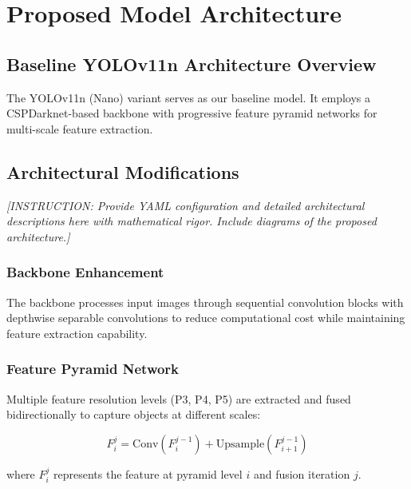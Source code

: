 \documentclass[11pt,a4paper]{article}
\begin{document}

\section{Proposed Model Architecture}
\label{sec:proposed_arch}

\subsection{Baseline YOLOv11n Architecture Overview}

The YOLOv11n (Nano) variant serves as our baseline model. It employs a CSPDarknet-based backbone 
with progressive feature pyramid networks for multi-scale feature extraction.

\subsection{Architectural Modifications}

\textit{[INSTRUCTION: Provide YAML configuration and detailed architectural descriptions here with 
mathematical rigor. Include diagrams of the proposed architecture.]}

\subsubsection{Backbone Enhancement}

The backbone processes input images through sequential convolution blocks with depthwise separable 
convolutions to reduce computational cost while maintaining feature extraction capability.

\subsubsection{Feature Pyramid Network}

Multiple feature resolution levels (P3, P4, P5) are extracted and fused bidirectionally to capture 
objects at different scales:

\begin{equation}
F_{i}^{j} = \text{Conv}(F_{i}^{j-1}) + \text{Upsample}(F_{i+1}^{j-1})
\end{equation}

where $F_i^j$ represents the feature at pyramid level $i$ and fusion iteration $j$.
\end{document}
